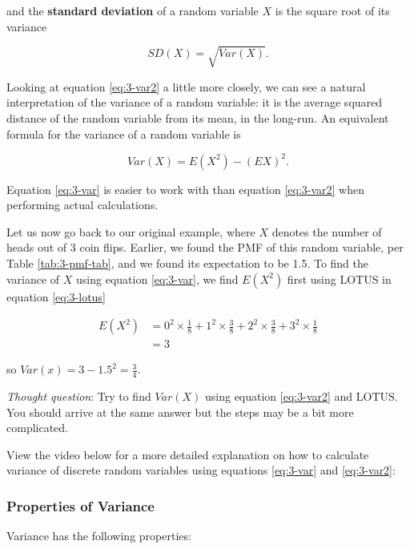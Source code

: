 \documentclass[
]{book}
\begin{document}
and the \textbf{standard deviation} of a random variable \(X\) is the square root of its variance

\begin{equation} 
SD(X) = \sqrt{Var(X)}.
\label{eq:3-sd}
\end{equation}

Looking at equation \eqref{eq:3-var2} a little more closely, we can see a natural interpretation of the variance of a random variable: it is the average squared distance of the random variable from its mean, in the long-run. An equivalent formula for the variance of a random variable is

\begin{equation} 
Var(X) = E(X^2) - (EX)^2.
\label{eq:3-var}
\end{equation}

Equation \eqref{eq:3-var} is easier to work with than equation \eqref{eq:3-var2} when performing actual calculations.

Let us now go back to our original example, where \(X\) denotes the number of heads out of 3 coin flips. Earlier, we found the PMF of this random variable, per Table \ref{tab:3-pmf-tab}, and we found its expectation to be 1.5. To find the variance of \(X\) using equation \eqref{eq:3-var}, we find \(E(X^2)\) first using LOTUS in equation \eqref{eq:3-lotus}

\[
\begin{split}
E(X^2) &= 0^2 \times \frac{1}{8} + 1^2 \times \frac{3}{8} + 2^2 \times \frac{3}{8} + 3^2 \times \frac{1}{8} \\
       &= 3
\end{split}
\]

so \(Var(x) = 3 - 1.5^2 = \frac{3}{4}\).

\emph{Thought question}: Try to find \(Var(X)\) using equation \eqref{eq:3-var2} and LOTUS. You should arrive at the same answer but the steps may be a bit more complicated.

View the video below for a more detailed explanation on how to calculate variance of discrete random variables using equations \eqref{eq:3-var} and \eqref{eq:3-var2}:

\subsubsection{Properties of Variance}\label{var-prop}

Variance has the following properties:
\end{document}
